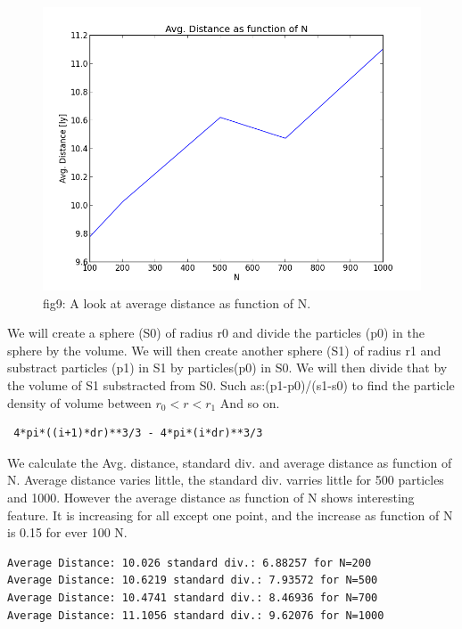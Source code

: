 \documentclass{article}
\begin{document}
\newpage
\begin{figure}[h!]
  \centering
  \includegraphics[scale=0.4]{g3.png}
  \caption{fig9: A look at average distance as function of N.}
\end{figure}
We will create a sphere (S0) of radius r0 and divide the particles (p0) in the sphere by the volume.
We will then create another sphere (S1) of radius r1 and substract particles (p1) in S1 by particles(p0) in S0.
We will then divide that by the volume of S1 substracted from S0. Such as:(p1-p0)/(s1-s0) to find the particle
density of volume between $r_0<r<r_1$ And so on.
\begin{verbatim} 4*pi*((i+1)*dr)**3/3 - 4*pi*(i*dr)**3/3 \end{verbatim}
We calculate the Avg. distance, standard div. and average distance as function of N.
Average distance varies little, the standard div. varries little for 500 particles and 1000.
However the average distance as function of N shows interesting feature. It is increasing for all 
except one point, and the increase as function of N is 0.15 for ever 100 N.
\begin{verbatim} 
Average Distance: 10.026 standard div.: 6.88257 for N=200
Average Distance: 10.6219 standard div.: 7.93572 for N=500
Average Distance: 10.4741 standard div.: 8.46936 for N=700
Average Distance: 11.1056 standard div.: 9.62076 for N=1000
\end{verbatim} 
\end{document}
